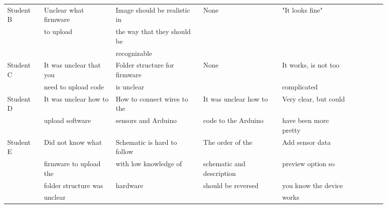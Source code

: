 \documentclass[conference]{IEEEtran}
\begin{document}
\begin{enumerate}
\begin{enumerate}
\begin{figure*}[!ht]
\begin{tabular}{ | l | l | l | l | l | l | l | l | l | l | }
			Student B		& Unclear what firmware		& Image	should be realistic in	& None						& "It looks fine"		\\ 
							& to upload					& the way that they should be 	& 							& 						\\ 
							&  							& recognizable					& 							& 						\\ \hline
							

			Student C		& It was unclear that you	& Folder structure for firmware& None						& It works, is not too	\\ 
							& need to upload code		& is unclear					& 							& complicated			\\ \hline

			Student D		& It was unclear how to 	& How to connect wires to the	& It was unclear how to 	& Very clear, but could	\\ 
							& upload software			& sensors and Arduino			& code to the Arduino		& have been more pretty	\\ \hline

			Student E		& Did not know what 		& Schematic is hard to follow	& The order of the 			& Add sensor data		\\ 
							& firmware to upload the	& with low knowledge of 		& schematic and description	& preview option so		\\ 
							& folder structure was 		& hardware						& should be reversed		& you know the device	\\ 
							& unclear					& 								& 							& works					\\ \hline
	

\end{tabular}
\end{figure*}
\end{enumerate}
\end{enumerate}
\end{document}
